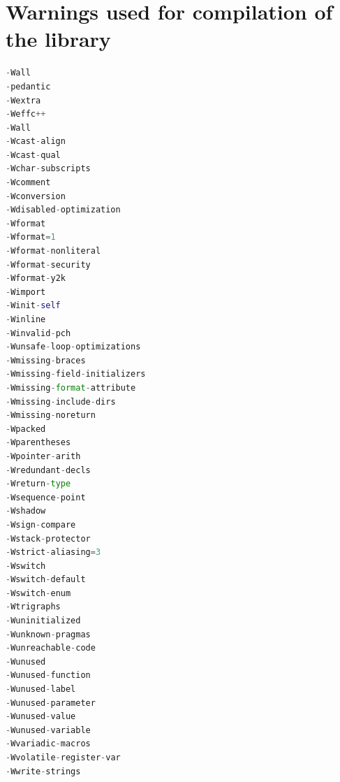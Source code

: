 \section{Warnings used for compilation of the library}
\begin{lstlisting}[language=python]
-Wall
-pedantic
-Wextra
-Weffc++
-Wall
-Wcast-align
-Wcast-qual
-Wchar-subscripts
-Wcomment
-Wconversion
-Wdisabled-optimization
-Wformat
-Wformat=1
-Wformat-nonliteral
-Wformat-security
-Wformat-y2k
-Wimport
-Winit-self
-Winline
-Winvalid-pch
-Wunsafe-loop-optimizations
-Wmissing-braces
-Wmissing-field-initializers
-Wmissing-format-attribute
-Wmissing-include-dirs
-Wmissing-noreturn
-Wpacked
-Wparentheses
-Wpointer-arith
-Wredundant-decls
-Wreturn-type
-Wsequence-point
-Wshadow
-Wsign-compare
-Wstack-protector
-Wstrict-aliasing=3
-Wswitch
-Wswitch-default
-Wswitch-enum
-Wtrigraphs
-Wuninitialized
-Wunknown-pragmas
-Wunreachable-code
-Wunused
-Wunused-function
-Wunused-label
-Wunused-parameter
-Wunused-value
-Wunused-variable
-Wvariadic-macros
-Wvolatile-register-var
-Wwrite-strings
\end{lstlisting}